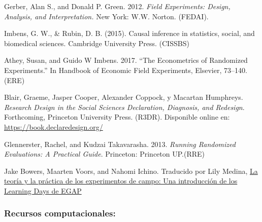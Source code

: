 \documentclass[
  12pt,
]{article}
\begin{document}
Gerber, Alan S., and Donald P. Green. 2012. \emph{Field Experiments:
Design, Analysis, and Interpretation.} New York: W.W. Norton. (FEDAI).

Imbens, G. W., \& Rubin, D. B. (2015). Causal inference in statistics,
social, and biomedical sciences. Cambridge University Press. (CISSBS)

Athey, Susan, and Guido W Imbens. 2017. ``The Econometrics of Randomized
Experiments.'' In Handbook of Economic Field Experiments, Elsevier,
73--140. (ERE)

Blair, Graeme, Jasper Cooper, Alexander Coppock, y Macartan Humphreys.
\emph{Research Design in the Social Sciences Declaration, Diagnosis, and
Redesign}. Forthcoming, Princeton University Press. (R3DR). Disponible
online en: \url{https://book.declaredesign.org/}

Glennerster, Rachel, and Kudzai Takavarasha. 2013. \emph{Running
Randomized Evaluations: A Practical Guide}. Princeton: Princeton
UP.(RRE)

Jake Bowers, Maarten Voors, and Nahomi Ichino. Traducido por Lily
Medina,
\href{https://lilymedina.github.io/theory_and_practice_of_field_experiments/}{La
teoría y la práctica de los experimentos de campo: Una introducción de
los Learning Days de EGAP}

\hypertarget{recursos-computacionales-1}{%
\subsubsection{Recursos
computacionales:}\label{recursos-computacionales-1}}
\end{document}
